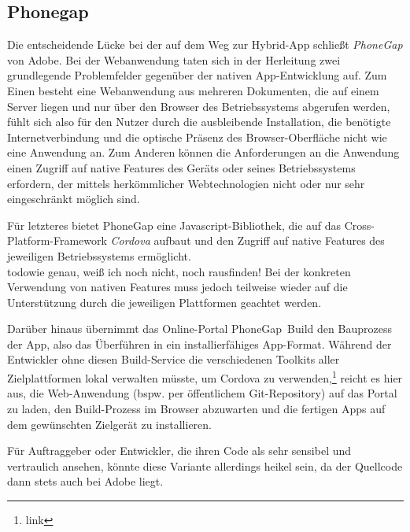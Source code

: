 \documentclass{scrreprt}
\begin{document}
\subsection{Phonegap}
Die entscheidende Lücke bei der auf dem Weg zur Hybrid-App schließt \emph{PhoneGap} von Adobe. Bei der Webanwendung taten sich in der Herleitung zwei grundlegende Problemfelder gegenüber der nativen App-Entwicklung auf. Zum Einen besteht eine Webanwendung aus mehreren Dokumenten, die auf einem Server liegen und nur über den Browser des Betriebssystems abgerufen werden, fühlt sich also für den Nutzer durch die ausbleibende Installation, die benötigte Internetverbindung und die optische Präsenz des Browser-Oberfläche nicht wie eine Anwendung an. Zum Anderen können die Anforderungen an die Anwendung einen Zugriff auf native Features des Geräts oder seines Betriebssystems erfordern, der mittels herkömmlicher Webtechnologien nicht oder nur sehr eingeschränkt möglich sind. 

Für letzteres bietet PhoneGap eine Javascript-Bibliothek, die auf das Cross-Platform-Framework \emph{Cordova} aufbaut und den Zugriff auf native Features des jeweiligen Betriebssystems ermöglicht.
\\todo{wie genau, weiß ich noch nicht, noch rausfinden!}
Bei der konkreten Verwendung von nativen Features muss jedoch teilweise wieder auf die Unterstützung durch die jeweiligen Plattformen geachtet werden.

Darüber hinaus übernimmt das Online-Portal PhoneGap~Build den Bauprozess der App, also das Überführen in ein installierfähiges App-Format. Während der Entwickler ohne diesen Build-Service die verschiedenen Toolkits aller Zielplattformen lokal verwalten müsste, um Cordova zu verwenden,\footnote{link} reicht es hier aus, die Web-Anwendung (bspw. per öffentlichem Git-Repository) auf das Portal zu laden, den Build-Prozess im Browser abzuwarten und die fertigen Apps auf dem gewünschten Zielgerät zu installieren. 

Für Auftraggeber oder Entwickler, die ihren Code als sehr sensibel und vertraulich ansehen, könnte diese Variante allerdings heikel sein, da der Quellcode dann stets auch bei Adobe liegt.
\end{document}
